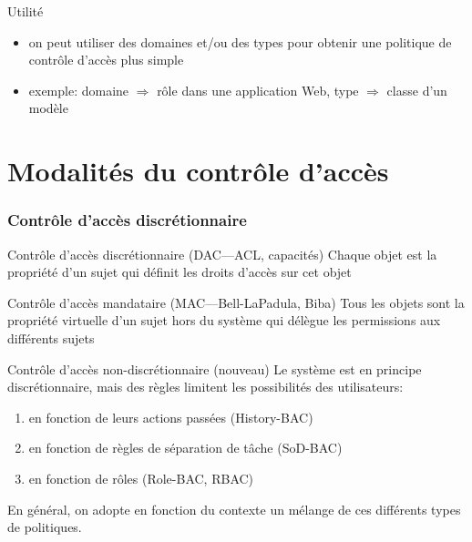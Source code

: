 \begin{reveals}
\begin{frame}
  \vfill
  \begin{block}{Utilité}
    \begin{itemize}
    \item on peut utiliser des domaines et/ou des types pour obtenir
      une politique de contrôle d'accès plus simple
    \item exemple: domaine \(\Rightarrow\) rôle dans une application Web,
      type \(\Rightarrow\) classe d'un modèle
    \end{itemize}
  \end{block}

  \vfill



\end{frame}



\section{Modalités du contrôle d'accès}

\begin{frame}
  \frametitle{Contrôle d'accès discrétionnaire}

  \vfill

   \begin{block}{Contrôle d'accès discrétionnaire (DAC---ACL, capacités)}
     Chaque objet est la propriété d'un sujet qui définit les droits
     d'accès sur cet objet
   \end{block}

  \vfill

   \begin{block}{Contrôle d'accès mandataire (MAC---Bell-LaPadula, Biba)}
     Tous les objets sont la propriété virtuelle d'un sujet hors du
     système qui délègue les permissions aux différents sujets
   \end{block}

  \vfill

   \begin{block}{Contrôle d'accès non-discrétionnaire (nouveau)}
     Le système est en principe discrétionnaire, mais des règles
     limitent les possibilités des utilisateurs:
     \begin{enumerate}
     \item en fonction de leurs actions passées (History-BAC)
     \item en fonction de règles de séparation de tâche (SoD-BAC)
     \item en fonction de rôles (Role-BAC, RBAC)
     \end{enumerate}
     En général, on adopte en fonction du contexte un mélange de ces
     différents types de politiques.
   \end{block}


\end{frame}
\end{reveals}
